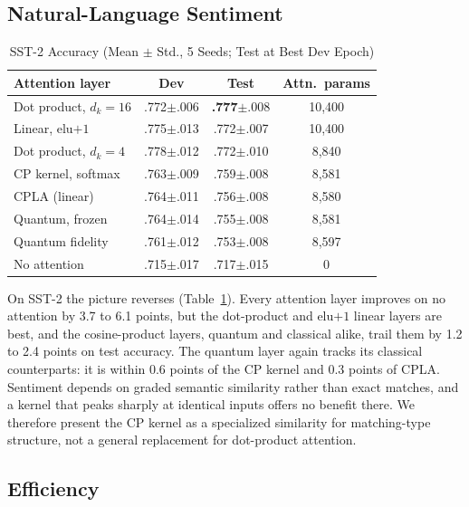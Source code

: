 \documentclass[conference]{IEEEtran}
\newcommand{\cpla}{CPLA}
\begin{document}
\subsection{Natural-Language Sentiment}

\begin{table}[t]
\caption{SST-2 Accuracy (Mean $\pm$ Std., 5 Seeds; Test at Best Dev Epoch)}
\label{tab:sst2}
\centering
\setlength{\tabcolsep}{3pt}
\begin{tabular}{@{}lccc@{}}
\toprule
Attention layer & Dev & Test & Attn.\ params \\
\midrule
Dot product, $d_k{=}16$ & .772$\pm$.006 & \textbf{.777}$\pm$.008 & 10{,}400 \\
Linear, elu$+1$         & .775$\pm$.013 & .772$\pm$.007 & 10{,}400 \\
Dot product, $d_k{=}4$  & .778$\pm$.012 & .772$\pm$.010 & 8{,}840 \\
CP kernel, softmax      & .763$\pm$.009 & .759$\pm$.008 & 8{,}581 \\
\cpla{} (linear)        & .764$\pm$.011 & .756$\pm$.008 & 8{,}580 \\
Quantum, frozen         & .764$\pm$.014 & .755$\pm$.008 & 8{,}581 \\
Quantum fidelity        & .761$\pm$.012 & .753$\pm$.008 & 8{,}597 \\
No attention            & .715$\pm$.017 & .717$\pm$.015 & 0 \\
\bottomrule
\end{tabular}
\end{table}

On SST-2 the picture reverses (Table~\ref{tab:sst2}). Every attention layer improves on no attention by 3.7 to 6.1 points, but the dot-product and elu$+1$ linear layers are best, and the cosine-product layers, quantum and classical alike, trail them by 1.2 to 2.4 points on test accuracy. The quantum layer again tracks its classical counterparts: it is within 0.6 points of the CP kernel and 0.3 points of \cpla. Sentiment depends on graded semantic similarity rather than exact matches, and a kernel that peaks sharply at identical inputs offers no benefit there. We therefore present the CP kernel as a specialized similarity for matching-type structure, not a general replacement for dot-product attention.

\subsection{Efficiency}
\end{document}
